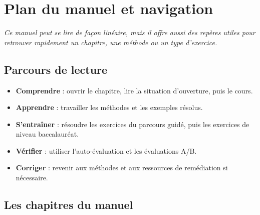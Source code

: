 
\chapter*{Plan du manuel et navigation}

\begin{center}
\begin{minipage}{0.88\textwidth}
\itshape Ce manuel peut se lire de façon linéaire, mais il offre aussi des
repères utiles pour retrouver rapidement un chapitre, une méthode ou un type
d'exercice.
\end{minipage}
\end{center}

\bigskip

\section*{Parcours de lecture}

\begin{itemize}
  \item \textbf{Comprendre} : ouvrir le chapitre, lire la situation d'ouverture,
puis le cours.
  \item \textbf{Apprendre} : travailler les méthodes et les exemples résolus.
  \item \textbf{S'entraîner} : résoudre les exercices du parcours guidé, puis
les exercices de niveau baccalauréat.
  \item \textbf{Vérifier} : utiliser l'auto-évaluation et les évaluations A/B.
  \item \textbf{Corriger} : revenir aux méthodes et aux ressources de remédiation
si nécessaire.
\end{itemize}

\section*{Les chapitres du manuel}

